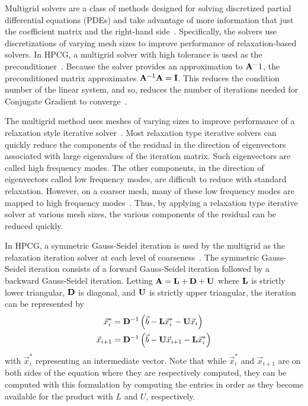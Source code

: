 Multigrid solvers are a class of methods designed for solving discretized partial differential equations (PDEs) and take advantage of more information that just the coefficient matrix and the right-hand side~\cite{Saad:2003:IterativeMethods}.
Specifically, the solvers use discretizations of varying mesh sizes to improve performance of relaxation-based solvers.
In HPCG, a multigrid solver with high tolerance is used as the preconditioner~\cite{Dongarra:2015:HPCG}.
Because the solver provides an approximation to \(\mathbf{A}^-1\), the preconditioned matrix approximates \(\mathbf{A}^{-1}\mathbf{A} = \mathbf{I}\).
This reduces the condition number of the linear system, and so, reduces the number of iterations needed for Conjugate Gradient to converge~\cite{Saad:2003:IterativeMethods}.

The multigrid method uses meshes of varying sizes to improve performance of a relaxation style iterative solver~\cite{Saad:2003:IterativeMethods}.
Most relaxation type iterative solvers can quickly reduce the components of the residual in the direction of eigenvectors associated with large eigenvalues of the iteration matrix.
Such eigenvectors are called high frequency modes.
The other components, in the direction of eigenvectors called low frequency modes, are difficult to reduce with standard relaxation.
However, on a coarser mesh, many of these low frequency modes are mapped to high frequency modes~\cite{Saad:2003:IterativeMethods}.
Thus, by applying a relaxation type iterative solver at various mesh sizes, the various components of the residual can be reduced quickly.

In HPCG, a symmetric Gauss-Seidel iteration is used by the multigrid as the relaxation iteration solver at each level of coarseness~\cite{Dongarra:2015:HPCG}.
The symmetric Gauss-Seidel iteration consists of a forward Gauss-Seidel iteration followed by a backward Gauss-Seidel iteration.
Letting \(\mathbf{A} = \mathbf{L}+\mathbf{D}+\mathbf{U}\) where \(\mathbf{L}\) is strictly lower triangular, \(\mathbf{D}\) is diagonal, and \(\mathbf{U}\) is strictly upper triangular, the iteration can be represented by
\begin{align*}
	\vec{x}^*_i   &= \mathbf{D}^{-1}\left(\vec{b} - \mathbf{L}\vec{x}^*_i - \mathbf{U}\vec{x}_i\right) \\
	\vec{x}_{i+1} &= \mathbf{D}^{-1}\left(\vec{b} - \mathbf{U}\vec{x}_{i+1} - \mathbf{L}\vec{x}^*_i\right)
\end{align*}
with \(\vec{x}_i^*\) representing an intermediate vector.
Note that while \(\vec{x}^*_i\) and \(\vec{x}_{i+1}\) are on both sides of the equation where they are respectively computed, they can be computed with this formulation by computing the entries in order as they become available for the product with \(L\) and \(U\), respectively.
